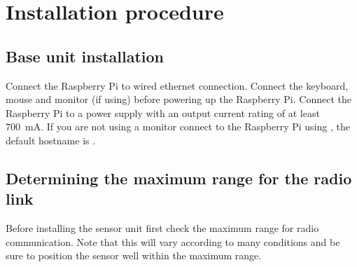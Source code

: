 \chapter{Installation procedure}

\section{Base unit installation}

Connect the Raspberry Pi to wired ethernet connection. Connect the
keyboard, mouse and monitor (if using) before powering up the
Raspberry Pi. Connect the Raspberry Pi to a  power supply with
an output current rating of at least \SI{700}{\milli A}. If you are
not using a monitor connect to the Raspberry Pi using \ssh, the
default hostname is .


\section{Determining the maximum range for the radio link}

Before installing the sensor unit first check the maximum range for
radio communication. Note that this will vary according to many
conditions and be sure to position the sensor well within the maximum
range.

